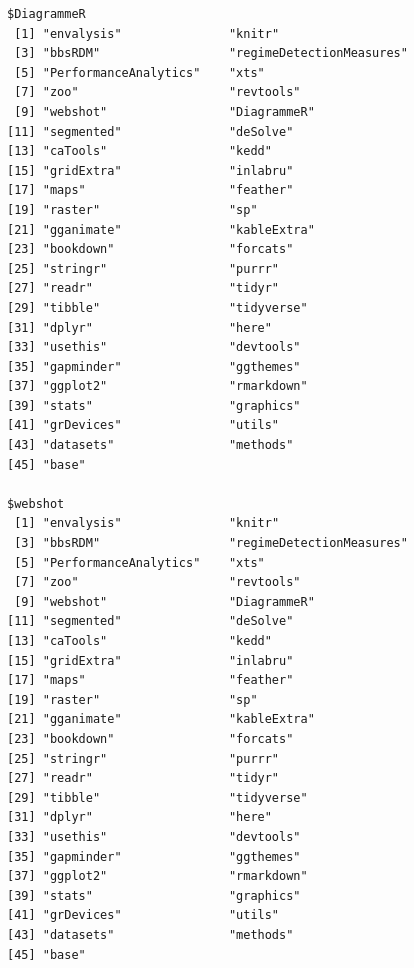 \documentclass[12pt,twoside,openany]{reedthesis}
\begin{document}
\begin{verbatim}
$DiagrammeR
 [1] "envalysis"               "knitr"                  
 [3] "bbsRDM"                  "regimeDetectionMeasures"
 [5] "PerformanceAnalytics"    "xts"                    
 [7] "zoo"                     "revtools"               
 [9] "webshot"                 "DiagrammeR"             
[11] "segmented"               "deSolve"                
[13] "caTools"                 "kedd"                   
[15] "gridExtra"               "inlabru"                
[17] "maps"                    "feather"                
[19] "raster"                  "sp"                     
[21] "gganimate"               "kableExtra"             
[23] "bookdown"                "forcats"                
[25] "stringr"                 "purrr"                  
[27] "readr"                   "tidyr"                  
[29] "tibble"                  "tidyverse"              
[31] "dplyr"                   "here"                   
[33] "usethis"                 "devtools"               
[35] "gapminder"               "ggthemes"               
[37] "ggplot2"                 "rmarkdown"              
[39] "stats"                   "graphics"               
[41] "grDevices"               "utils"                  
[43] "datasets"                "methods"                
[45] "base"                   

$webshot
 [1] "envalysis"               "knitr"                  
 [3] "bbsRDM"                  "regimeDetectionMeasures"
 [5] "PerformanceAnalytics"    "xts"                    
 [7] "zoo"                     "revtools"               
 [9] "webshot"                 "DiagrammeR"             
[11] "segmented"               "deSolve"                
[13] "caTools"                 "kedd"                   
[15] "gridExtra"               "inlabru"                
[17] "maps"                    "feather"                
[19] "raster"                  "sp"                     
[21] "gganimate"               "kableExtra"             
[23] "bookdown"                "forcats"                
[25] "stringr"                 "purrr"                  
[27] "readr"                   "tidyr"                  
[29] "tibble"                  "tidyverse"              
[31] "dplyr"                   "here"                   
[33] "usethis"                 "devtools"               
[35] "gapminder"               "ggthemes"               
[37] "ggplot2"                 "rmarkdown"              
[39] "stats"                   "graphics"               
[41] "grDevices"               "utils"                  
[43] "datasets"                "methods"                
[45] "base"                   


\end{verbatim}
\end{document}
